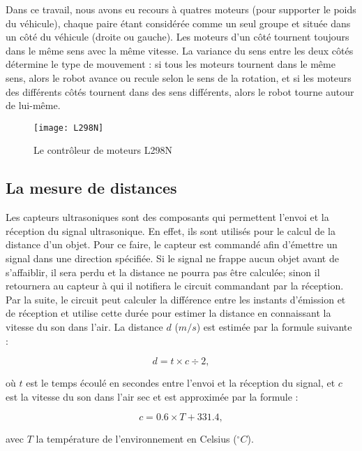 Dans ce travail, nous avons eu recours à quatres moteurs
(pour supporter le poids du véhicule), chaque paire étant considérée comme un
seul groupe et située dans un côté du véhicule (droite ou gauche).
Les moteurs d'un côté tournent toujours dans le même sens avec la même vitesse.
La variance du sens entre les deux côtés détermine le type de mouvement : si
tous les moteurs tournent dans le même sens, alors le robot avance ou recule
selon le sens de la rotation, et si les moteurs des différents côtés tournent dans
des sens différents, alors le robot tourne autour de lui-même.

\begin{figure}[h]
\begin{center}
\texttt{[image: L298N]}
\caption{Le contrôleur de moteurs L298N}
\end{center}
\end{figure}

\subsection{La mesure de distances}

Les capteurs ultrasoniques sont des composants qui permettent l'envoi et la
réception du signal ultrasonique. En effet, ils sont utilisés pour le calcul
de la distance d'un objet. Pour ce faire, le capteur est commandé afin d'émettre
un signal dans une direction spécifiée. Si le signal ne frappe aucun objet avant de
s'affaiblir, il sera perdu et la distance ne pourra pas être calculée; sinon il
retournera au capteur à qui il notifiera le circuit commandant par la réception.
Par la suite, le circuit peut calculer la différence entre les instants d'émission
et de réception et utilise cette durée pour estimer la distance en connaissant
la vitesse du son dans l'air. La distance $d$ ($m/s$) est estimée par la formule suivante :

\begin{equation}
  d = t \times c \div 2,
\end{equation}

où $t$ est le temps écoulé en secondes entre l'envoi et la réception du signal,
et $c$ est la vitesse du son dans l'air sec et est approximée par la formule :

\begin{equation}
  c = 0.6 \times T + 331.4,
\end{equation}

avec $T$ la température de l'environnement en Celsius ($ ^\circ C$).

